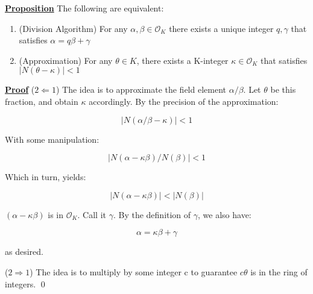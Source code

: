 \documentclass{article}
\newcommand{\new}[1]{
    \vspace{2mm}
    \noindent
    \textbf{
    \underline{#1}}
}
\def\INT{{\mathcal{O}}}
\newcommand{\Proof}{{
    \vspace{2mm}
    \noindent
    \textbf{
    \underline{Proof}}
}
}
\begin{document}
\new{Proposition} The following are equivalent:
\begin{enumerate}
    \item (Division Algorithm) For any $\alpha, \beta \in \INT_K$ 
    there exists a unique integer $q, \gamma$
    that satisfies $\alpha = q\beta + \gamma$
    \item (Approximation) For any $\theta \in K$,
    there exists a K-integer $\kappa \in \INT_K$
    that satisfies $|N(\theta - \kappa)| < 1$
\end{enumerate}

\Proof ($2 \Leftarrow 1$) The idea is to 
approximate the field element $\alpha / \beta$. 
Let $\theta$ be this fraction, and obtain 
$\kappa$ accordingly. By the precision of 
the approximation:

\[
    |N(\alpha/\beta - \kappa)| < 1
\]

With some manipulation:

\[
    |N(\alpha-\kappa\beta)/N(\beta)| < 1
\]

Which in turn, yields:

\[
    |N(\alpha - \kappa\beta)| < |N(\beta)|
\]

$(\alpha - \kappa\beta)$ is in $\INT_K$. Call it 
$\gamma$. By the definition of $\gamma$, 
we also have:

\[
    \alpha = \kappa\beta + \gamma
\]

as desired. 
\checkmark

($2 \Rightarrow 1$) The idea is to multiply by 
some integer c to guarantee $c\theta$ is in 
the ring of integers.  
\qed
\end{document}
